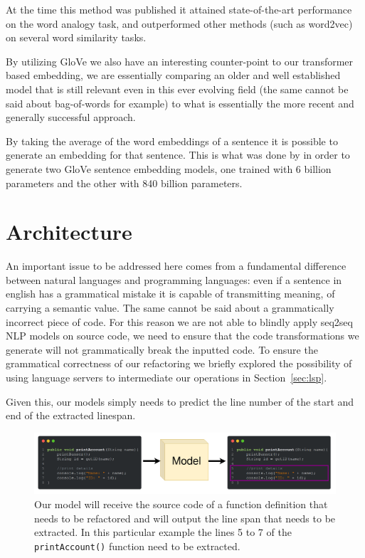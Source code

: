 At the time this method was published it attained state-of-the-art performance on the word analogy task, and outperformed other methods (such as word2vec) on several word similarity tasks.



By utilizing GloVe we also have an interesting counter-point to our transformer based embedding, we are essentially comparing an older and well established model that is still relevant even in this ever evolving field (the same cannot be said about bag-of-words for example) to what is essentially the more recent and generally successful approach.


By taking the average of the word embeddings of a sentence it is possible to generate an embedding for that sentence. This is what was done by \citet{sbert_site} in order to generate two GloVe sentence embedding models, one trained with 6 billion parameters and the other with 840 billion parameters.





\section{Architecture}

An important issue to be addressed here comes from a fundamental difference between natural languages and programming languages: even if a sentence in english has a grammatical mistake it is capable of transmitting meaning, of carrying a semantic value. The same cannot be said about a grammatically incorrect piece of code.
For this reason we are not able to blindly apply seq2seq NLP models on source code, we need to ensure that the code transformations we generate will not grammatically break the inputted code. To ensure the grammatical correctness of our refactoring we briefly explored the possibility of using language servers to intermediate our operations in Section~\ref{sec:lsp}.


Given this, our models simply needs to predict the line number of the start and end of the extracted linespan.


\begin{figure}[!ht]
\centering
\centerline{\includegraphics[scale=0.35]{figuras/modelo.png}}
\caption{Our model will receive the source code of a function definition that needs to be refactored and will output the line span that needs to be extracted. In this particular example the lines 5 to 7 of the \texttt{printAccount()} function need to be extracted.}
\label{modelo}
\end{figure}

